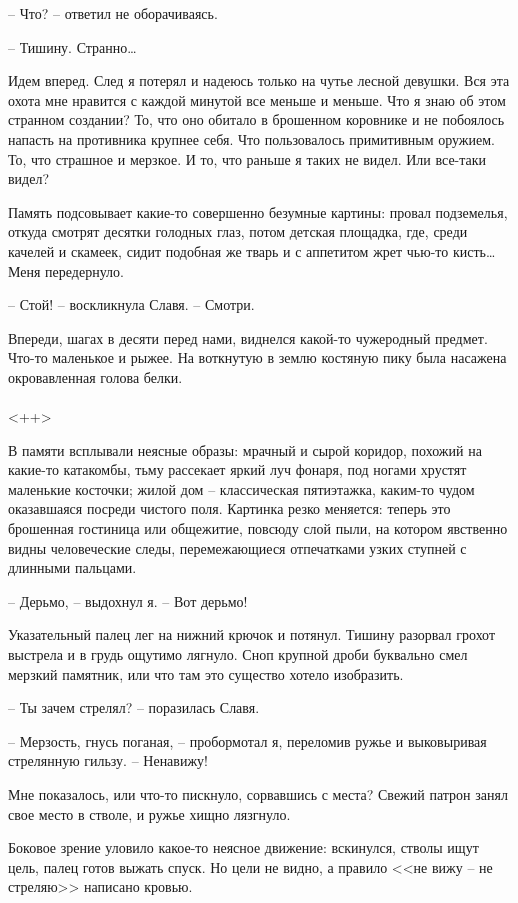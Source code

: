 \documentclass[a4paper]{book}
\begin{document}
-- Что? -- ответил не оборачиваясь.

-- Тишину. Странно\ldots

Идем вперед. След я потерял и надеюсь только на чутье лесной девушки. Вся эта охота мне нравится с каждой минутой все меньше и меньше. Что я знаю об этом странном создании? То, что оно обитало в брошенном коровнике и не побоялось напасть на противника крупнее себя. Что пользовалось примитивным оружием. То, что страшное и мерзкое. И то, что раньше я таких не видел. Или все-таки видел? 

Память подсовывает какие-то совершенно безумные картины: провал подземелья, откуда смотрят десятки голодных глаз, потом детская площадка, где, среди качелей и скамеек, сидит подобная же тварь и с аппетитом жрет чью-то кисть\ldots Меня передернуло.

-- Стой! -- воскликнула Славя. -- Смотри.

Впереди, шагах в десяти перед нами, виднелся какой-то чужеродный предмет. Что-то маленькое и рыжее. На воткнутую в землю костяную пику была насажена окровавленная голова белки.

\paragraph{}<++>

В памяти всплывали неясные образы: мрачный и сырой коридор, похожий на какие-то катакомбы, тьму рассекает яркий луч фонаря, под ногами хрустят маленькие косточки; жилой дом -- классическая пятиэтажка, каким-то чудом оказавшаяся посреди чистого поля. Картинка резко меняется: теперь это брошенная гостиница или общежитие, повсюду слой пыли, на котором явственно видны человеческие следы, перемежающиеся  отпечатками узких ступней с длинными пальцами. 

-- Дерьмо, -- выдохнул я. -- Вот дерьмо!

Указательный палец лег на нижний крючок и потянул. Тишину разорвал грохот выстрела и в грудь ощутимо лягнуло. Сноп крупной дроби буквально смел мерзкий памятник, или что там это существо хотело изобразить.

-- Ты зачем стрелял? -- поразилась Славя.

-- Мерзость, гнусь поганая, -- пробормотал я, переломив ружье и выковыривая стрелянную гильзу. -- Ненавижу! 

Мне показалось, или что-то пискнуло, сорвавшись с места? Свежий патрон занял свое место в стволе, и ружье хищно лязгнуло. 

Боковое зрение уловило какое-то неясное движение: вскинулся, стволы ищут цель, палец  готов выжать спуск. Но цели не видно, а правило <<не вижу -- не стреляю>> написано кровью.
\end{document}
